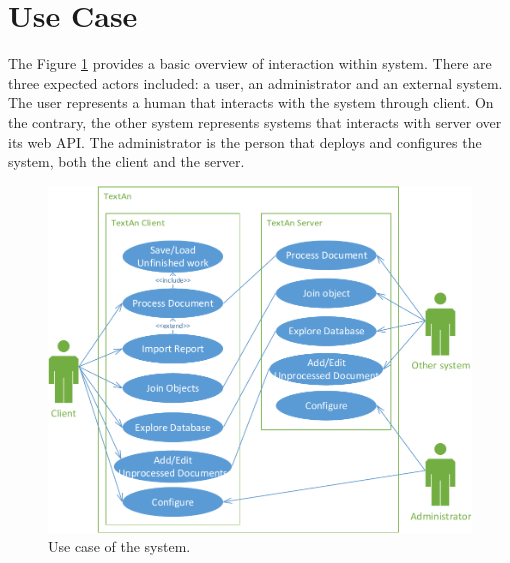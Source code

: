 \section{Use Case}

The Figure \ref{fig:UseCase} provides a basic overview of interaction within
\textan{} system. There are three expected actors included: a user, an
administrator and an external system. The user represents a human that interacts
with the system through \textan{} client. On the contrary, the other system
represents systems that interacts with \textan{} server over its web API. The
administrator is the person that deploys and configures the system, both the
client and the server.

\begin{figure}[!htb]
        \centering
        \includegraphics[width=(0.9\textwidth)]{Images/UseCase}
        \caption{Use case of the system.}
        \label{fig:UseCase}
\end{figure}

